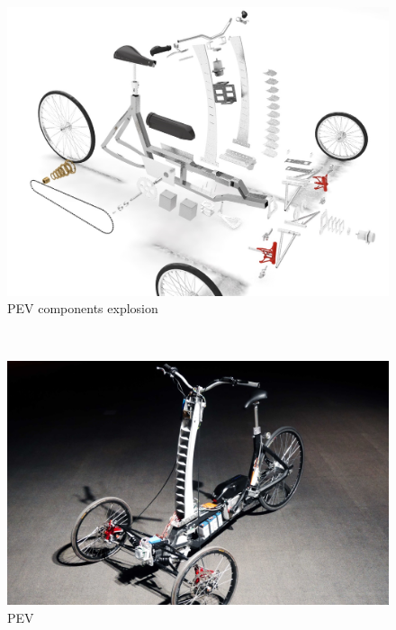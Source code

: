 \newpage
\begin{figure}[h!]
	\includegraphics[width=0.9\linewidth]{figs/05/CreamBox0150}
	\caption{PEV components explosion}
\end{figure}
$ $
\begin{figure}[h!]
	\includegraphics[width=0.95\linewidth]{figs/05/P10507152}
	\caption{PEV}
\end{figure}




